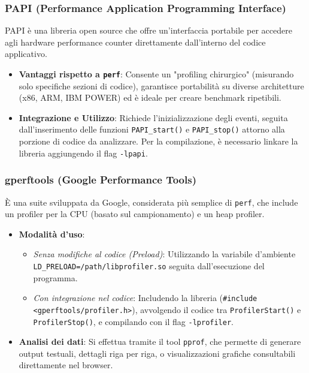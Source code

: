 \subsubsection*{PAPI (Performance Application Programming Interface)}
PAPI è una libreria open source che offre un'interfaccia portabile per accedere agli hardware performance counter direttamente dall'interno del codice applicativo.

\begin{itemize}
    \item \textbf{Vantaggi rispetto a \texttt{perf}}: Consente un "profiling chirurgico" (misurando solo specifiche sezioni di codice), garantisce portabilità su diverse architetture (x86, ARM, IBM POWER) ed è ideale per creare benchmark ripetibili.
    \item \textbf{Integrazione e Utilizzo}: Richiede l'inizializzazione degli eventi, seguita dall'inserimento delle funzioni \texttt{PAPI\_start()} e \texttt{PAPI\_stop()} attorno alla porzione di codice da analizzare. Per la compilazione, è necessario linkare la libreria aggiungendo il flag \texttt{-lpapi}.
\end{itemize}

\subsubsection*{gperftools (Google Performance Tools)}
È una suite sviluppata da Google, considerata più semplice di \texttt{perf}, che include un profiler per la CPU (basato sul campionamento) e un heap profiler.

\begin{itemize}
    \item \textbf{Modalità d'uso}:
    \begin{itemize}
        \item \textit{Senza modifiche al codice (Preload)}: Utilizzando la variabile d'ambiente \texttt{LD\_PRELOAD=/path/libprofiler.so} seguita dall'esecuzione del programma.
        \item \textit{Con integrazione nel codice}: Includendo la libreria (\texttt{\#include <gperftools/profiler.h>}), avvolgendo il codice tra \texttt{ProfilerStart()} e \texttt{ProfilerStop()}, e compilando con il flag \texttt{-lprofiler}.
    \end{itemize}
    \item \textbf{Analisi dei dati}: Si effettua tramite il tool \texttt{pprof}, che permette di generare output testuali, dettagli riga per riga, o visualizzazioni grafiche consultabili direttamente nel browser.
\end{itemize}

